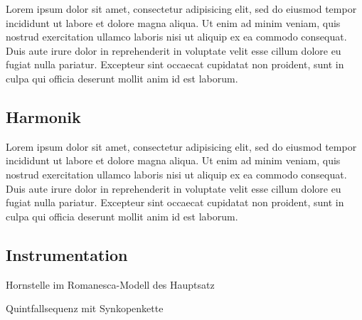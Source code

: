 Lorem ipsum dolor sit amet, consectetur adipisicing elit, sed do eiusmod tempor incididunt ut labore et dolore magna aliqua. Ut enim ad minim veniam, quis nostrud exercitation ullamco laboris nisi ut aliquip ex ea commodo consequat. Duis aute irure dolor in reprehenderit in voluptate velit esse cillum dolore eu fugiat nulla pariatur. Excepteur sint occaecat cupidatat non proident, sunt in culpa qui officia deserunt mollit anim id est laborum.


\subsection{Harmonik}

Lorem ipsum dolor sit amet, consectetur adipisicing elit, sed do eiusmod tempor incididunt ut labore et dolore magna aliqua. Ut enim ad minim veniam, quis nostrud exercitation ullamco laboris nisi ut aliquip ex ea commodo consequat. Duis aute irure dolor in reprehenderit in voluptate velit esse cillum dolore eu fugiat nulla pariatur. Excepteur sint occaecat cupidatat non proident, sunt in culpa qui officia deserunt mollit anim id est laborum.



\subsection{Instrumentation}

Hornstelle im Romanesca-Modell des Hauptsatz

Quintfallsequenz mit Synkopenkette
